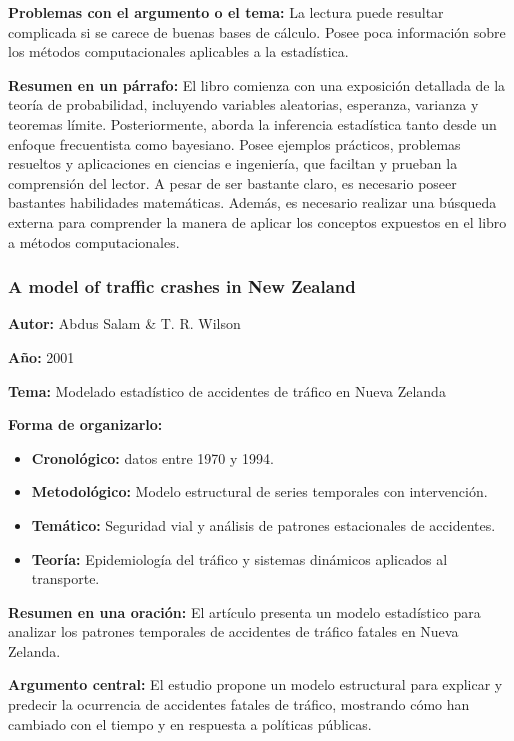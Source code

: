 \documentclass{book}
\begin{document}
\textbf{Problemas con el argumento o el tema:} La lectura puede resultar complicada si se carece de buenas bases de cálculo. Posee poca información sobre los métodos computacionales aplicables a la estadística.

\textbf{Resumen en un párrafo:} El libro comienza con una exposición detallada de la teoría de probabilidad, incluyendo variables aleatorias, esperanza, varianza y teoremas límite. Posteriormente, aborda la inferencia estadística tanto desde un enfoque frecuentista como bayesiano. Posee ejemplos prácticos, problemas resueltos y aplicaciones en ciencias e ingeniería, que faciltan y prueban la comprensión del lector. A pesar de ser bastante claro, es necesario poseer bastantes habilidades matemáticas. Además, es necesario realizar una búsqueda externa para comprender la manera de aplicar los conceptos expuestos en el libro a métodos computacionales.


\subsubsection{A model of traffic crashes in New Zealand}
\textbf{Autor:} Abdus Salam \& T. R. Wilson

\textbf{Año:} 2001

\textbf{Tema:} Modelado estadístico de accidentes de tráfico en Nueva Zelanda

\textbf{Forma de organizarlo:}
\begin{itemize}
\setlength{\itemindent}{0.5in}
    \item \textbf{Cronológico:} datos entre 1970 y 1994.
    \item \textbf{Metodológico:} Modelo estructural de series temporales con intervención.
    \item \textbf{Temático:} Seguridad vial y análisis de patrones estacionales de accidentes.
    \item \textbf{Teoría:} Epidemiología del tráfico y sistemas dinámicos aplicados al transporte.
\end{itemize}

\textbf{Resumen en una oración:} El artículo presenta un modelo estadístico para analizar los patrones temporales de accidentes de tráfico fatales en Nueva Zelanda.

\textbf{Argumento central:} El estudio propone un modelo estructural para explicar y predecir la ocurrencia de accidentes fatales de tráfico, mostrando cómo han cambiado con el tiempo y en respuesta a políticas públicas.
\end{document}
